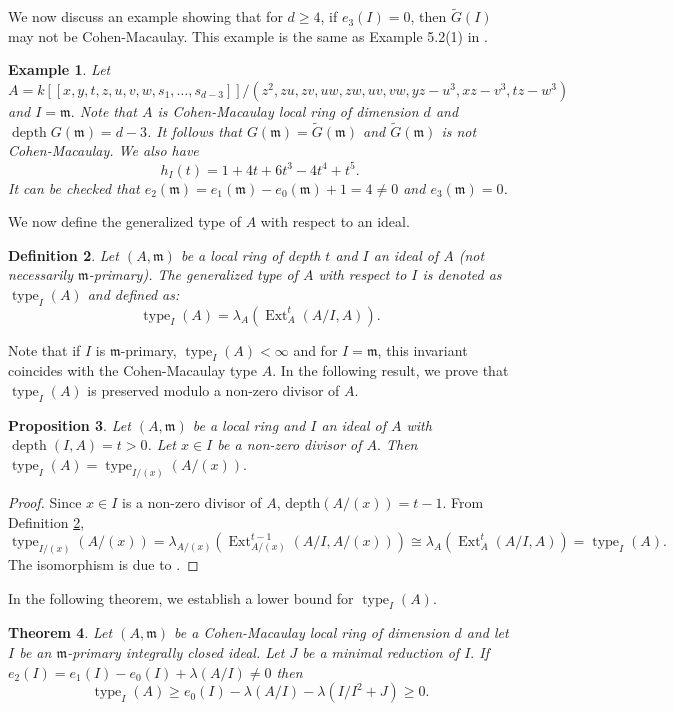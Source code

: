 \documentclass[11pt]{amsart}
\theoremstyle{plain}
\newtheorem{theorem}{Theorem}[section]
\newtheorem{proposition}[theorem]{Proposition}
\newtheorem{definition}[theorem]{Definition}
\newtheorem{example}[theorem]{Example}
\newcommand{\m}{\mathfrak{m}}
\newcommand{\wt}{\widetilde}
\newcommand{\depth}{\operatorname{depth}}
\newcommand{\Ext}{\operatorname{Ext}}
\newcommand{\type}{\operatorname{type}}
\theoremstyle{plain}
\begin{document}
We now discuss an example showing that for $d\geq 4$, if $e_3(I)=0$, then $\wt{G}(I)$ may not be Cohen-Macaulay. This example is the same as Example 5.2(1) in \cite{ankit}.

\begin{example}
\normalfont
     Let $A=k[[x,y,t,z,u,v,w,s_1,\ldots , s_{d-3}]]/
    (z^2,zu,zv,uw,zw,uv,vw,yz-u^3,xz-v^3,tz-w^3)$ and $I=\m.$ Note that $A$ is Cohen-Macaulay local ring of dimension $d$ and
    $\operatorname{depth} G(\m)=d-3$. It follows that $G(\m)=\wt{G}(\m)$ and $\wt{G}(\m)$ is not Cohen-Macaulay. We also have
    $$ h_I(t)=1+4t+6t^3-4t^4+t^5.$$ It can be checked that $e_2(\m)=e_1(\m)-e_0(\m)+1=4\neq 0$ and $e_3(\m)=0$.  
\end{example}

We now define the generalized type of $A$ with respect to an ideal.

\begin{definition}\label{def} \normalfont
    Let $(A,\m)$ be a local ring of depth $t$ and $I$ an ideal of $A$ (not necessarily $\m$-primary). The \textit{generalized type} of $A$ with respect to $I$ is denoted as $\type_I(A)$ and defined as: $$\type_I(A)=\lambda_A\left(\Ext^t_{A}(A/I,A)\right).$$ 
\end{definition}
Note that if $I$ is $\m$-primary, $\type_I(A)<\infty$ and for $I=\m$, this invariant coincides with the Cohen-Macaulay type $A$. In the following result, we prove that  $\type_I(A)$ is preserved modulo a non-zero divisor  of $A.$
\begin{proposition}\label{type}
     Let $(A,\m)$ be a local ring and $I$ an ideal of $A$ with $\depth(I, A)=t>0$. Let $x\in I$ be a  non-zero divisor of $A.$ Then $\type_I(A)=\type_{I/(x)}(A/(x)).$
\end{proposition}

\begin{proof}
    Since $x\in I$ is a non-zero divisor of $A$, depth$(A/(x))=t-1$. From Definition \ref{def}, $$\type_{I/(x)}(A/(x))=\lambda_{A/(x)}\left(\Ext^{t-1}_{A/(x)}(A/I,A/(x))\right)\cong \lambda_{A}\left(\Ext^{t}_{A}(A/I,A)\right)=\type_I(A).$$ The isomorphism is due to \cite[Lemma 3.1.16]{Bruns}.
\end{proof}

In the following theorem, we establish a lower bound for $\type_{I}(A).$


\begin{theorem}\label{bd}
   Let $(A,\m)$ be a Cohen-Macaulay local ring of dimension $d$ and let $I$ be an $\m$-primary integrally closed ideal. Let $J$ be a minimal reduction of $I.$ If $e_{2}(I)=e_{1}(I)-e_{0}(I)+\lambda(A/I) \neq 0$ then $$\type_I(A) \geq e_{0}(I)-\lambda(A/I)-\lambda(I/I^{2}+J)\geq 0.$$
\end{theorem}
\end{document}
